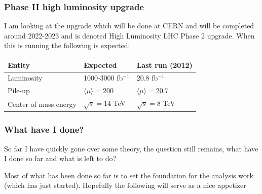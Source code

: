 \documentclass[•]{beamer}
\theoremstyle{remark}
\begin{document}
\begin{frame}\frametitle{Phase II high luminosity upgrade}
\begin{block}

I am looking at the upgrade which will be done at CERN and will be completed around 2022-2023 and is denoted High Luminosity LHC Phase 2 upgrade. When this is running the following is expected:
\end{block}
\renewcommand{\arraystretch}{1.5} %
\begin{table}[H]
\begin{center}
    \begin{tabular}{ | l | l | l |}
    \hline
    Entity & Expected & Last run (2012) \\ \hline
  	Luminosity & 1000-3000 fb$^{-1}$ & 20.8 fb$^{-1}$ \\ \hline
  	Pile-up & $\langle \mu \rangle=200$ & $\langle \mu \rangle=20.7$ \\ \hline
  	Center of mass energy & $\sqrt{s}=14$ TeV &  $\sqrt{s}=8$ TeV \\ \hline
  	\end{tabular}
  	
   	\end{center}
    \end{table}
    \renewcommand{\arraystretch}{1.0}  %

\end{frame}
\begin{frame}\frametitle{What have I done?}
\begin{block}

So far I have quickly gone over some theory, the question still remains, what have I done so far and what is left to do?

Most of what has been done so far is to set the foundation for the analysis work (which has just started). Hopefully the following will serve as a nice appetizer
\end{block}

\end{frame}
\end{document}
